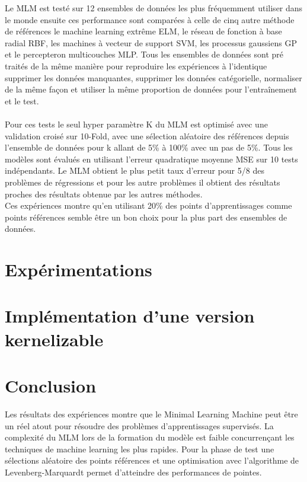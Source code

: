 \documentclass[12pt,a4paper]{report}
\begin{document}
\par Le MLM est testé sur 12 ensembles de données les plus fréquemment utiliser dans le monde ensuite ces performance sont comparées à celle de cinq autre  méthode de références le machine learning extrême ELM, le réseau de fonction à base radial RBF, les machines à vecteur de support SVM, les processus gaussiens GP et le percepteron multicouches MLP. Tous les ensembles de données sont pré traités de la même manière pour reproduire les expériences à l'identique supprimer les données manquantes, supprimer les données catégorielle, normaliser de la même façon et utiliser la même proportion de données pour l'entraînement et le test. \\ \\
Pour ces tests le seul hyper paramètre K du MLM est optimisé avec une validation croisé sur 10-Fold, avec une sélection aléatoire des références depuis l'ensemble de données pour k allant de 5\% à 100\% avec un pas de 5\%. Tous les modèles sont évalués en utilisant l'erreur quadratique moyenne MSE sur 10 tests indépendants. Le MLM obtient le plus petit taux d'erreur pour 5/8 des problèmes de régressions et pour les autre problèmes il obtient des résultats proches des résultats obtenue par les autres méthodes.\\
Ces expériences montre qu'en utilisant 20\% des points d'apprentissages comme points références semble être un bon choix pour la plus part des ensembles de données.

\chapter{Expérimentations}
\chapter{Implémentation d'une version kernelizable}
\chapter{Conclusion}

\par Les résultats des expériences montre que le Minimal Learning Machine peut être un réel atout pour résoudre des problèmes d'apprentissages supervisés. La complexité du MLM lors de la formation du modèle est faible concurrençant les techniques de machine learning les plus rapides. Pour la phase de test une sélections aléatoire des points références et une optimisation avec l'algorithme de Levenberg-Marquardt permet d'atteindre des performances de pointes.\\
\end{document}
